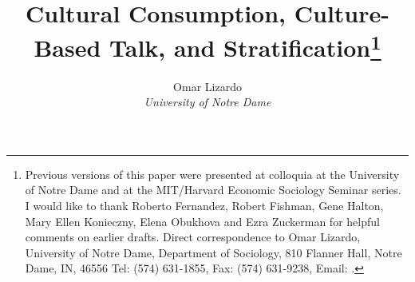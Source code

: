 \documentclass[11pt]{article}
\begin{document}
\title{Cultural Consumption, Culture-Based Talk, and Stratification\footnote{Previous versions of this paper were presented at colloquia at the University of Notre Dame and at the MIT/Harvard Economic Sociology Seminar series. I would like to thank Roberto Fernandez, Robert Fishman, Gene Halton, Mary Ellen Konieczny, Elena Obukhova and Ezra Zuckerman for helpful comments on earlier drafts.  Direct correspondence to Omar Lizardo, University of Notre Dame, Department of Sociology, 810 Flanner Hall, Notre Dame, IN, 46556  Tel: (574) 631-1855, Fax: (574) 631-9238, Email: .}}
\author{Omar Lizardo \\ \textit{University of Notre Dame}}
\maketitle









\end{document}
